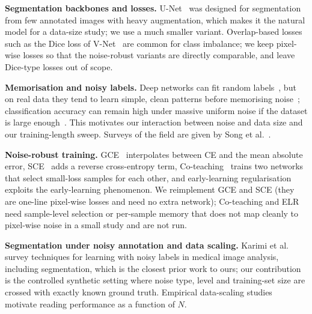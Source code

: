 \textbf{Segmentation backbones and losses.} U-Net~\cite{ronneberger2015u} was designed for segmentation from few annotated images with heavy augmentation, which makes it the natural model for a data-size study; we use a much smaller variant. Overlap-based losses such as the Dice loss of V-Net~\cite{milletari2016v} are common for class imbalance; we keep pixel-wise losses so that the noise-robust variants are directly comparable, and leave Dice-type losses out of scope.

\textbf{Memorisation and noisy labels.} Deep networks can fit random labels~\cite{zhang2016understanding}, but on real data they tend to learn simple, clean patterns before memorising noise~\cite{arpit2017closer}; classification accuracy can remain high under massive uniform noise if the dataset is large enough~\cite{rolnick2017deep}. This motivates our interaction between noise and data size and our training-length sweep. Surveys of the field are given by Song et al.~\cite{song2020learning}.

\textbf{Noise-robust training.} GCE~\cite{zhang2018generalized} interpolates between CE and the mean absolute error, SCE~\cite{wang2019symmetric} adds a reverse cross-entropy term, Co-teaching~\cite{han2018co} trains two networks that select small-loss samples for each other, and early-learning regularisation~\cite{liu2020early} exploits the early-learning phenomenon. We reimplement GCE and SCE (they are one-line pixel-wise losses and need no extra network); Co-teaching and ELR need sample-level selection or per-sample memory that does not map cleanly to pixel-wise noise in a small study and are not run.

\textbf{Segmentation under noisy annotation and data scaling.} Karimi et al.~\cite{karimi2019deep} survey techniques for learning with noisy labels in medical image analysis, including segmentation, which is the closest prior work to ours; our contribution is the controlled synthetic setting where noise type, level and training-set size are crossed with exactly known ground truth. Empirical data-scaling studies~\cite{hestness2017deep} motivate reading performance as a function of $N$.
